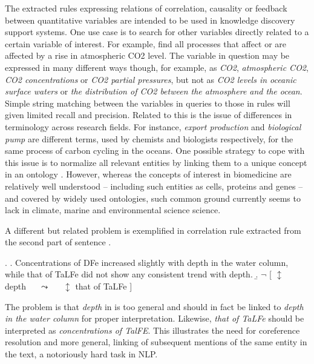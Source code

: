 \documentclass[10pt, a4paper]{article}
\begin{document}
The extracted rules expressing relations of correlation, causality or feedback between quantitative variables are intended to be used in knowledge discovery support systems.
One use case is to search for other variables directly related to a certain variable of interest.
For example, find all processes that affect or are affected by a rise in atmospheric CO2 level.
The variable in question may be expressed in many different ways though, for example, as \emph{CO2}, \emph{atmospheric CO2}, \emph{CO2 concentrations} or \emph{CO2 partial pressures}, but not as \emph{ CO2 levels in oceanic surface waters} or \emph{the distribution of CO2 between the atmosphere and the ocean}.
Simple string matching between the variables in queries to those in rules will given limited recall and precision.
Related to this is the issue of differences in terminology across research fields.
For instance, \emph{export production} and \emph{biological pump} are different terms, used by chemists and biologists respectively, for the same process of carbon cycling in the oceans. 
One possible strategy to cope with this issue is to normalize all relevant entities by linking them to a unique concept in an ontology \cite{Bada2012Concept}.
However, whereas the concepts of interest in biomedicine are relatively well understood -- including such entities as cells, proteins and genes -- and covered by widely used ontologies, such common ground currently seems to lack in climate, marine and environmental science science.

A different but related problem is exemplified in correlation rule \Next[b] extracted from the second part of sentence \Next[a].

\exi. 
  \a. Concentrations of DFe increased slightly with depth in the water column, while that of TaLFe did not show any consistent trend with depth.
  \b. $\neg$ [ $\updownarrow$ depth~~~$\leadsto$~~~$\updownarrow$ that of TaLFe ]

The problem is that \emph{depth} in \Last[b] is too general and should in fact be linked to \emph{depth in the water column} for proper interpretation. 
Likewise, \emph{that of TaLFe} should be interpreted as \emph{concentrations of TalFE}.
This illustrates the need for coreference resolution and more general, linking of subsequent mentions of the same entity in the text, a notoriously hard task in NLP. 
\end{document}
